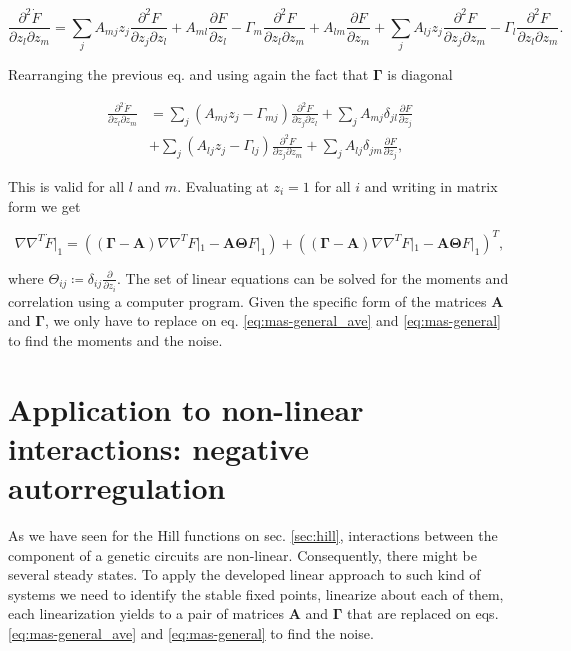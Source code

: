 \begin{equation*}
  \frac{\partial^2\dot{F}}{\partial z_l \partial z_m} = \sum_jA_{mj}z_j\frac{\partial^2F}{\partial z_j\partial z_l}+A_{ml}\frac{\partial F}{\partial z_l} - \Gamma_m\frac{\partial^2F}{\partial z_l\partial z_m} + A_{lm}\frac{\partial F}{\partial z_m} + \sum_jA_{lj}z_j\frac{\partial^2F}{\partial z_j\partial z_m}-\Gamma_l\frac{\partial^2F}{\partial z_l\partial z_m}.
\end{equation*}

Rearranging the previous eq. and using again the fact that $\mathbf{\Gamma}$ is diagonal

\begin{equation*}
  \begin{split}
    \frac{\partial^2\dot{F}}{\partial z_l \partial z_m} &= \sum_j\left(A_{mj}z_j-\Gamma_{mj}\right)\frac{\partial^2F}{\partial z_j\partial z_l} + \sum_jA_{mj}\delta_{jl}\frac{\partial F}{\partial z_j}\\
    &+\sum_j\left(A_{lj}z_j-\Gamma_{lj}\right)\frac{\partial^2F}{\partial z_j\partial z_m} + \sum_jA_{lj}\delta_{jm}\frac{\partial F}{\partial z_j},
  \end{split}
\end{equation*}

This is valid for all $l$ and $m$. Evaluating at $z_i=1$ for all $i$ and writing in matrix form we get

\begin{equation}
  \label{eq:mas-general}
  \nabla\nabla^T\dot{F}|_1 = \left(\left(\mathbf{\Gamma} - \mathbf{A}\right)\nabla\nabla^TF|_1 - \mathbf{A}\mathbf{\Theta} F|_1\right)+\left(\left(\mathbf{\Gamma} - \mathbf{A}\right)\nabla\nabla^TF|_1 - \mathbf{A}\mathbf{\Theta} F|_1\right)^T,
\end{equation}

where $\Theta_{ij} \coloneqq \delta_{ij}\frac{\partial}{\partial z_i}$. The set of linear equations can be solved for the moments and correlation using a computer program. Given the specific form of the matrices $\mathbf{A}$ and $\mathbf{\Gamma}$, we only have to replace on eq. \eqref{eq:mas-general_ave} and \eqref{eq:mas-general} to find the moments and the noise.

\section{Application to non-linear interactions: negative autorregulation}
\label{sec:mas-neg_autorreg}

As we have seen for the Hill functions on sec. \ref{sec:hill}, interactions between the component of a genetic circuits are non-linear. Consequently, there might be several steady states. To apply the developed linear approach to such kind of systems we need to identify the stable fixed points, linearize about each of them, each linearization yields to a pair of matrices $\mathbf{A}$ and $\mathbf{\Gamma}$  that are replaced on eqs. \eqref{eq:mas-general_ave} and \eqref{eq:mas-general} to find the noise.

